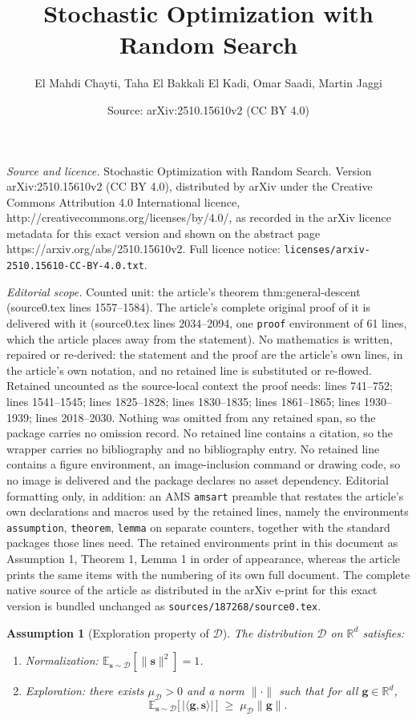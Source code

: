 \documentclass[10pt,a4paper]{amsart}
\title{Stochastic Optimization with Random Search}
\author{El Mahdi Chayti, Taha El Bakkali El Kadi, Omar Saadi, Martin Jaggi}
\date{Source: arXiv:2510.15610v2 (CC BY 4.0)}
\newtheorem{assumption}{Assumption}
\newcommand{\E}{\mathbb{E}}
\def\vg{{\bm{g}}}
\def\vs{{\bm{s}}}
\begin{document}
\maketitle

\noindent\emph{Source and licence.} Stochastic Optimization with Random Search. Version arXiv:2510.15610v2 (CC BY 4.0), distributed by arXiv under the Creative Commons Attribution 4.0 International licence, http://creativecommons.org/licenses/by/4.0/, as recorded in the arXiv licence metadata for this exact version and shown on the abstract page https://arxiv.org/abs/2510.15610v2. Full licence notice: \texttt{licenses/arxiv-2510.15610-CC-BY-4.0.txt}.\par\smallskip

\noindent\textit{Editorial scope.} Counted unit: the article's theorem thm:general-descent (source0.tex lines 1557--1584). The article's complete original proof of it is delivered with it (source0.tex lines 2034--2094, one \texttt{proof} environment of 61 lines, which the article places away from the statement). No mathematics is written, repaired or re-derived: the statement and the proof are the article's own lines, in the article's own notation, and no retained line is substituted or re-flowed.  Retained uncounted as the source-local context the proof needs: lines 741--752; lines 1541--1545; lines 1825--1828; lines 1830--1835; lines 1861--1865; lines 1930--1939; lines 2018--2030.  Nothing was omitted from any retained span, so the package carries no omission record.  No retained line contains a citation, so the wrapper carries no bibliography and no bibliography entry.  No retained line contains a figure environment, an image-inclusion command or drawing code, so no image is delivered and the package declares no asset dependency.  Editorial formatting only, in addition: an AMS \texttt{amsart} preamble that restates the article's own declarations and macros used by the retained lines, namely the environments \texttt{assumption}, \texttt{theorem}, \texttt{lemma} on separate counters, together with the standard packages those lines need.  The retained environments print in this document as Assumption 1, Theorem 1, Lemma 1 in order of appearance, whereas the article prints the same items with the numbering of its own full document.  The complete native source of the article as distributed in the arXiv e-print for this exact version is bundled unchanged as \texttt{sources/187268/source0.tex}.
\begin{assumption}[Exploration property of $\mathcal{D}$]
\label{ass:distribution}
The distribution $\mathcal{D}$ on $\mathbb{R}^d$ satisfies:
\begin{enumerate}
    \item Normalization: $\E_{\vs \sim \mathcal{D}}[\|\vs\|^2] = 1$.
    \item Exploration: there exists $\mu_{\mathcal{D}} > 0$ and a norm $\|\cdot\|$ such that for all $\vg \in \mathbb{R}^d$,
    \begin{equation}
        \E_{\vs \sim \mathcal{D}} \big[\, |\langle \vg, \vs \rangle| \,\big] 
        \;\geq\; \mu_{\mathcal{D}} \|\vg\|.
    \end{equation}
\end{enumerate}
\end{assumption}
\end{document}
